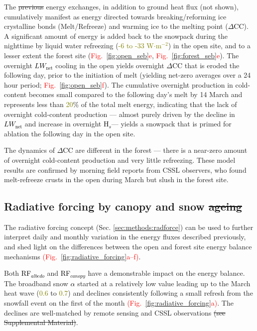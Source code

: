 \documentclass[draft]{agujournal2019}
\newcommand{\fig}[2]{\textcolor{red}{(Fig.~\ref{#1}{#2})}}   %
\newcommand{\fignop}[2]{\textcolor{red}{Fig.~\ref{#1}{#2}}}  %
\newcommand{\mynum}[1]{\textcolor{olive}{#1}}
\newcommand{\lwnet}{\textcolor{black}{$LW_{\mathrm{net}}$}\xspace}
\newcommand{\hs}{\textcolor{black}{H$_s$}\xspace}
\newcommand{\dcc}{\textcolor{black}{$\Delta$CC}\xspace}
\newcommand{\albedo}{\textcolor{black}{$\alpha$}\xspace}
\newcommand{\rfalb}{\textcolor{black}{RF$_{albedo}$}\xspace}
\newcommand{\rfcanopy}{\textcolor{black}{RF$_{canopy}$}\xspace}
\newcommand{\wmsq}{\textcolor{olive}{W$\cdot$m$^{-2}$}\xspace}
\providecommand{\DIFadd}[1]{{\protect\color{blue}\uwave{#1}}} %
\providecommand{\DIFdel}[1]{{\protect\color{red}\sout{#1}}}                      %
\providecommand{\DIFaddbegin}{} %
\providecommand{\DIFaddend}{} %
\providecommand{\DIFdelbegin}{} %
\providecommand{\DIFdelend}{} %
\begin{document}
The \DIFdelbegin \DIFdel{previous }\DIFdelend \DIFaddbegin \DIFadd{preceding }\DIFaddend energy exchanges, in addition to ground heat flux (not shown), cumulatively manifest as energy directed towards breaking/reforming ice crystalline bonds (Melt/Refreeze) and warming ice to the melting point (\dcc).
A significant amount of energy is added back to the snowpack during the nighttime by liquid water refreezing (\mynum{-6 to -33} \wmsq) in the open site, and to a lesser extent \DIFaddbegin \DIFadd{in }\DIFaddend the forest site (\fignop{fig:open_seb}{e}, \fignop{fig:forest_seb}{e}).
The overnight \lwnet cooling in the open yields overnight \dcc that is eroded the following day, prior to the initiation of melt (yielding net-zero averages over a 24 hour period; \fignop{fig:open_seb}{f}).
The cumulative overnight production in cold-content becomes small compared to the following day's melt by 14 March and represents less than \mynum{20}\% of the total melt energy, indicating that the lack of overnight cold-content production --- almost purely driven by the decline in \lwnet and increase in overnight \hs --- yields a snowpack that is primed for ablation the following day in the open site.

The dynamics of \dcc are different in the forest --- there is a near-zero amount of overnight cold-content production and very little refreezing.
These model results are confirmed by morning field reports from CSSL observers, who found melt-refreeze crusts in the open during March but slush in the forest site.


\subsection{Radiative forcing by canopy and snow \DIFdelbegin \DIFdel{ageing}\DIFdelend \DIFaddbegin \DIFadd{aging}\DIFaddend }
The radiative forcing concept (Sec. \ref{sec:methods:radforce}) can be used to further interpret daily and monthly variation in the energy fluxes described previously, and shed light on the differences between the open and forest site energy balance mechanisms \fig{fig:radiative_forcing}{a--f}.

Both \rfalb and \rfcanopy have a demonstrable impact on the energy balance.
The broadband snow \albedo started at a relatively low value leading up to the March heat wave (\mynum{0.6} to \mynum{0.7}) and declines consistently following a small refresh from the snowfall event on the first of the month \fig{fig:radiative_forcing}{a}.
The declines are well-matched by remote sensing and CSSL observations \DIFdelbegin \DIFdel{(see Supplemental Material)}\DIFdelend \DIFaddbegin \DIFadd{\fig{fig:supp_albedo_validation}{}}\DIFaddend .
\end{document}
